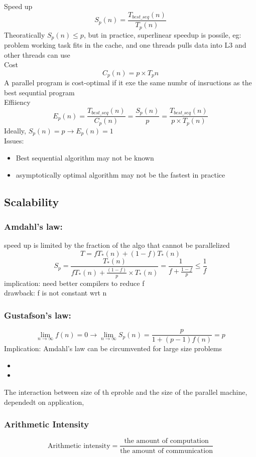 \documentclass{article}
\begin{document}
Speed up
\[S_p(n) = \frac{T_{best\_seq}(n)}{T_p(n)}\]
Theoratically $S_p(n) \leq p$, but in practice, superlinear speedup is possile, eg: problem working task fits in the cache, and one threads pulls data into L3 and other threads can use\\
Cost
\[C_p(n) = p \times T_p{n}\]
A parallel program is cost-optimal if it exe the same numbr of insructions as the best sequntial program\\
Effiiency
\[E_p(n) = \frac{T_{best\_seq}(n)}{C_p(n)} = \frac{S_p(n)}{p} = \frac{T_{best\_seq}(n)}{p\times T_p(n)}\]
Ideally, $S_p(n) = p \rightarrow E_p(n) = 1$\\
Issues: 
\begin{itemize}
    \item Best sequential algorithm may not be known
    \item asymptotically optimal algorithm may not be the fastest in practice
\end{itemize}
\subsection{Scalability}
\subsubsection*{Amdahl's law: }
speed up is limited by the fraction of the algo that cannot be parallelized\\
\[T = fT_*(n) + (1-f)T_*(n)\]
\[S_p = \frac{T_*(n)}{fT_*(n) + \frac{(1-f)}{p}\times T_*(n)} = \frac{1}{f + \frac{1-f}{p}} \leq \frac{1}{f}\]
implication: need better compilers to reduce f\\
drawback: f is not constant wrt n\\
\subsubsection*{Gustafson's law:}
\[\lim_{n\rightarrow \infty} f(n) = 0 \rightarrow \lim_{n\rightarrow \infty} S_p(n) = \frac{p}{1 + (p-1)f(n)} = p\]
Implication: Amdahl's law can be circumvented for large size problems
\begin{itemize}
    \item 
    \item 
\end{itemize}

The interaction between size of th eproble  and the size of the parallel machine, dependedt on application, 


\subsubsection*{Arithmetic Intensity}
\[\text{Arithmetic intensity} = \frac{\text{the amount of computation}}{\text{the amount of communication}}\]
\end{document}
